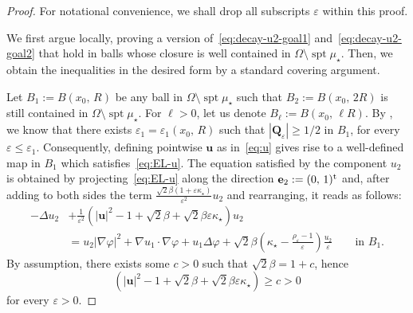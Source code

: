 \documentclass[a4paper, 11pt, twoside, leqno]{article}
\theoremstyle{definition}              %
\theoremstyle{remark}                  %
\DeclareMathOperator{\spt}{spt}                                     %
\newcommand{\abs}[1]{\left| #1 \right|}                             %
\newcommand{\Q}{\mathbf{Q}}
\newcommand{\e}{\mathbf{e}}
\renewcommand{\u}{\mathbf{u}}
\newcommand{\eps}{\varepsilon}
\begin{document}
\begin{proof}
    For notational convenience, we shall drop all subscripts $\eps$ within this proof. 

    We first argue locally, proving a version 
    of~\eqref{eq:decay-u2-goal1} and~\eqref{eq:decay-u2-goal2} 
    that hold in balls whose closure is well contained in 
    $\Omega \setminus \spt \mu_\star$. 
    Then, we obtain the inequalities in the desired form by a 
    standard covering argument. 
    
    Let $B_1 := B(x_0,\,R)$ be any ball in $\Omega \setminus \spt\mu_\star$ 
    such that $B_2 := B(x_0,\,2R)$ is still contained in $\Omega \setminus \spt\mu_\star$. 
    For $\ell > 0$, let us denote $B_{\ell} := B(x_0,\,\ell R)$. 
    By \cite[Corollary~3.8]{CDS1}, we know that there exists $\eps_1 = \eps_1(x_0,\,R)$ 
    such that $\abs{\Q_\eps} \geq 1/2$ in $B_1$, for every $\eps \leq \eps_1$. 
    Consequently, defining pointwise $\u$ as in~\eqref{eq:u} 
    gives rise to a well-defined map in $B_1$ which satisfies~\eqref{eq:EL-u}. 
    The equation satisfied by the component $u_2$ is obtained by projecting~\eqref{eq:EL-u} along the direction $\e_2 := (0,\,1)^{\rm t}$ and, after adding to both sides the term $\frac{\sqrt{2}\beta(1+\eps \kappa_\star)}{\eps^2} u_2$ 
    and rearranging, it reads as follows:
    \begin{equation}\label{eq:EL-u2}
    \begin{split}
        -\Delta u_2 &+ \frac{1}{\eps^2} \left( \abs{\u}^2 - 1 + \sqrt{2}\beta + \sqrt{2}\beta \eps \kappa_\star \right) u_2 \\
        &= u_2 \abs{\nabla \varphi}^2 + \nabla u_1 \cdot \nabla \varphi + u_1 \Delta \varphi + \sqrt{2}\beta  \left(\kappa_\star - \frac{\rho_\eps - 1}{\eps}\right)\frac{u_2}{\eps} \qquad \mbox{in } B_1.
    \end{split}
    \end{equation}
    By assumption, there exists some $c > 0$ such that $\sqrt{2}\beta = 1 + c$, 
    hence 
    \[
    	\left( \abs{\u}^2 - 1 + \sqrt{2}\beta + \sqrt{2}\beta \eps \kappa_\star \right) \geq c > 0
    \] 
    for every $\eps > 0$.


\end{proof}
\end{document}
